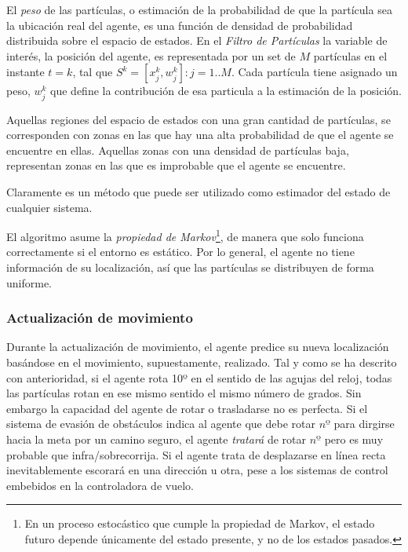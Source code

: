 El \textit{peso} de las partículas, o estimación de la probabilidad de que la partícula sea la ubicación real del agente, es una función de densidad de probabilidad distribuida sobre el espacio de estados. 
En el \emph{Filtro de Partículas} la variable de interés, la posición del agente, es representada por un set de $M$ partículas en el instante $t = k$, tal que $S^k=[x_j^k,w_j^k]:j=1..M$. Cada partícula tiene asignado un peso, $w_j^k$ que define la contribución de esa particula a la estimación de la posición.

Aquellas regiones del espacio de estados con una gran cantidad de partículas, se corresponden con zonas en las que hay una alta probabilidad de que el agente se encuentre en ellas. Aquellas zonas con una densidad de partículas baja, representan zonas en las que es improbable que el agente se encuentre.

Claramente es un método que puede ser utilizado como estimador del estado de cualquier sistema.

El algoritmo asume la \textit{propiedad de Markov}\footnote{En un proceso estocástico que cumple la propiedad de Markov, el estado futuro depende únicamente del estado presente, y no de los estados pasados.}, de manera que solo funciona correctamente si el entorno es estático. Por lo general, el agente no tiene información de su localización, así que las partículas se distribuyen de forma uniforme.

\subsubsection{Actualización de movimiento}
Durante la actualización de movimiento, el agente predice su nueva localización basándose en el movimiento, supuestamente, realizado. Tal y como se ha descrito con anterioridad, si el agente rota 10º en el sentido de las agujas del reloj, todas las partículas rotan en ese mismo sentido el mismo número de grados. 
Sin embargo la capacidad del agente de rotar o trasladarse no es perfecta. Si el sistema de evasión de obstáculos indica al agente que debe rotar $nº$ para dirgirse hacia la meta por un camino seguro, el agente \emph{tratará} de rotar $nº$ pero es muy probable que infra/sobrecorrija.
Si el agente trata de desplazarse en línea recta inevitablemente escorará en una dirección u otra, pese a los sistemas de control embebidos en la controladora de vuelo. 

